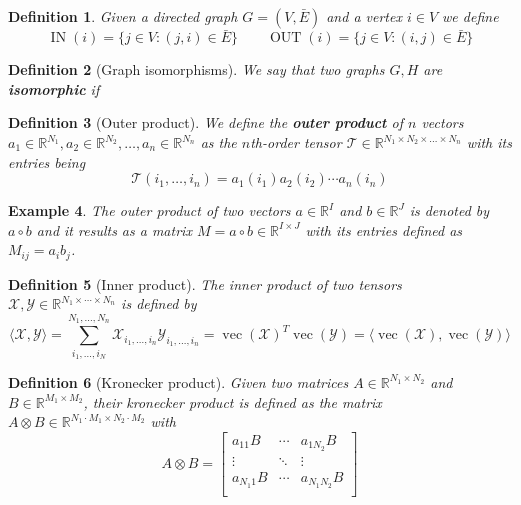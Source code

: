 \documentclass[11pt,a4paper,openright,oneside]{book}
\numberwithin{equation}{section}
\newtheorem{defn0}{Definition}[chapter]
\newtheorem{example0}[defn0]{Example}
\newenvironment{definition}{ \begin{defn0}}{\end{defn0}}
\newenvironment{example}{ \begin{example0}\rm}{\end{example0}}
\DeclareMathOperator{\vectorize}{vec}
\DeclareMathOperator{\IN}{IN}
\DeclareMathOperator{\OUT}{OUT}
\begin{document}
\begin{definition} Given a directed graph $G=(V,\bar{E})$ and a vertex $i \in V$ we define
    $$\IN(i) = \{j \in V : (j, i) \in \bar{E}\} \qquad \OUT(i) = \{j \in V : (i, j) \in \bar{E} \}$$
\end{definition}
\iffalse
\begin{definition}[Graph isomorphisms]
    We say that two graphs $G, H$ are \textbf{isomorphic} if 
\end{definition}


\begin{definition}[Outer product]
    We define the \textbf{outer product} of $n$ vectors 
    $a_1 \in \mathbb{R}^{N_1}, a_2 \in \mathbb{R}^{N_2}, \dots, a_n \in \mathbb{R}^{N_n}$
    as the $n$th-order tensor $\mathcal{T} \in \mathbb{R}^{N_1 \times N_2 \times \dots \times N_n}$ with its entries being
    $$\mathcal{T}(i_1, \dots, i_n) = a_1(i_1) a_2(i_2) \cdots a_n(i_n)$$
\end{definition}

\begin{example}
The outer product of two vectors $a \in \mathbb{R}^I$ and $b \in \mathbb{R}^J$ is denoted by $a \circ b$ and it results
as a matrix $M = a \circ b \in \mathbb{R}^{I \times J}$ with its entries defined as $M_{ij} = a_i b_j$.
\end{example}


\begin{definition}[Inner product]
The inner product of two tensors $\mathcal{X}, \mathcal{Y} \in \mathbb{R}^{N_1 \times \cdots \times N_n}$ is defined by
$$\langle \mathcal{X},\mathcal{Y} \rangle = \sum_{i_1, \dots, i_N}^{N_1, \dots, N_n} \mathcal{X}_{i_1, \dots, i_n} \mathcal{Y}_{i_1, \dots, i_n} = 
\vectorize(\mathcal{X})^T \vectorize(\mathcal{Y}) = \langle \vectorize(\mathcal{X}), \vectorize(\mathcal{Y}) \rangle$$
\end{definition}


\begin{definition}[Kronecker product]
     Given two matrices $A \in \mathbb{R}^{N_1 \times N_2}$ and $B \in \mathbb{R}^{M_1 \times M_2}$,
    their kronecker product is defined as the matrix $A \otimes B \in \mathbb{R}^{N_1 \cdot M_1 \times N_2 \cdot M_2}$ with
    $$A \otimes B = \begin{bmatrix}
        a_{11}B & \cdots & a_{1N_2}B \\ 
        \vdots & \ddots & \vdots \\
        a_{N_1 1}B & \cdots & a_{N_1 N_2}B \\
    \end{bmatrix}$$
\end{definition}
\end{document}
